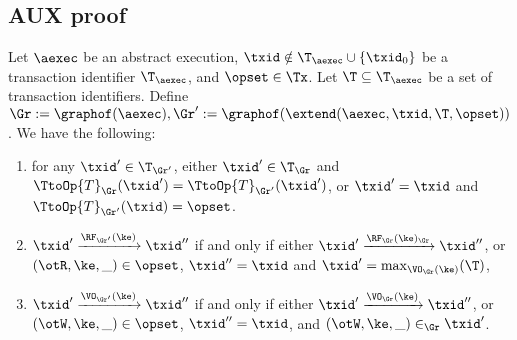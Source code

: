 \subsection{AUX proof}
\label{sec:kvtrace2aexec}

\begin{lemma}
\label{lem:graph.extend}
Let $\aexec$ be an abstract execution, 
$\txid \notin \T_{\aexec} \cup \{\txid_0\}$ be a transaction identifier $\T_{\aexec}$, and $\opset \in \Tx$. 
Let $\T \subseteq \T_{\aexec}$ be a set of transaction identifiers.
Define $\Gr := \graphof(\aexec), \Gr' := \graphof(\extend(\aexec, \txid, \T, \opset))$. 
We have the following: 
\begin{enumerate}
\item for any $\txid' \in \T_{\Gr'}$, either $\txid' \in \T_{\Gr}$ and $\TtoOp{T}_{\Gr}(\txid') = \TtoOp{T}_{\Gr'}(\txid')$, 
or $\txid' = \txid$ and $\TtoOp{T}_{\Gr'}(\txid) = \opset$.
\item $\txid' \xrightarrow{\RF_{\Gr'}(\ke)} \txid''$ if and only if either 
$\txid' \xrightarrow{\RF_{\Gr}(\ke)_{\Gr}} \txid''$, or $(\otR, \ke, \_) \in \opset$, $\txid'' = \txid$ and 
$\txid' = \max_{\VO_{\Gr}(\ke)}(\T)$, 
\item $\txid' \xrightarrow{\VO_{\Gr'}(\ke)} \txid''$ if and only if 
either $\txid' \xrightarrow{\VO_{\Gr}(\ke)} \txid''$, or $(\otW, \ke, \_) \in \opset$, $\txid'' = \txid$, 
and $(\otW, \ke, \_) \in_{\Gr} \txid'$.
\end{enumerate}
\end{lemma}

